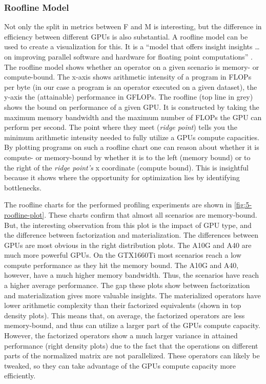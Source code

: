 \subsubsection*{Roofline Model}
Not only the split in metrics between F and M is interesting, but the difference in efficiency between different GPUs is also substantial. A roofline model can be used to create a visualization for this. It is a “model that offers insight insights \ldots on improving parallel software and hardware for floating point computations” \cite{roofline}. The roofline model shows whether an operator on a given scenario is memory- or compute-bound. The x-axis shows arithmetic intensity of a program in FLOPs per byte (in our case a program is an operator executed on a given dataset), the y-axis the (attainable) performance in GFLOPs. The roofline (top line in grey) shows the bound on performance of a given GPU. It is constructed by taking the maximum memory bandwidth and the maximum number of FLOPs the GPU can perform per second. The point where they meet (\textit{ridge point}) tells you the minimum arithmetic intensity needed to fully utilize a GPUs compute capacities. By plotting programs on such a roofline chart one can reason about whether it is compute- or memory-bound by whether it is to the left (memory bound) or to the right of the \textit{ridge point's} x coordinate (compute bound). This is insightful because it shows where the opportunity for optimization lies by identifying bottlenecks.

The roofline charts for the performed profiling experiments are shown in \autoref{fig:5-roofline-plot}. These charts confirm that almost all scenarios are memory-bound. But, the interesting observation from this plot is the impact of GPU type, and the difference between factorization and materialization. The differences between GPUs are most obvious in the right distribution plots. The A10G and A40 are much more powerful GPUs. On the GTX1660Ti most scenarios reach a low compute performance as they hit the memory bound. The A10G and A40, however, have a much higher memory bandwidth. Thus, the scenarios have reach a higher average performance. The gap these plots show between factorization and materialization gives more valuable insights. The materialized operators have lower arithmetic complexity than their factorized equivalents (shown in top density plots). This means that, on average, the factorized operators are less memory-bound, and thus can utilize a larger part of the GPUs compute capacity. However, the factorized operators show a much larger variance in attained performance (right density plots) due to the fact that the operations on different parts of the normalized matrix are not parallelized. These operators can likely be tweaked, so they can take advantage of the GPUs compute capacity more efficiently.

